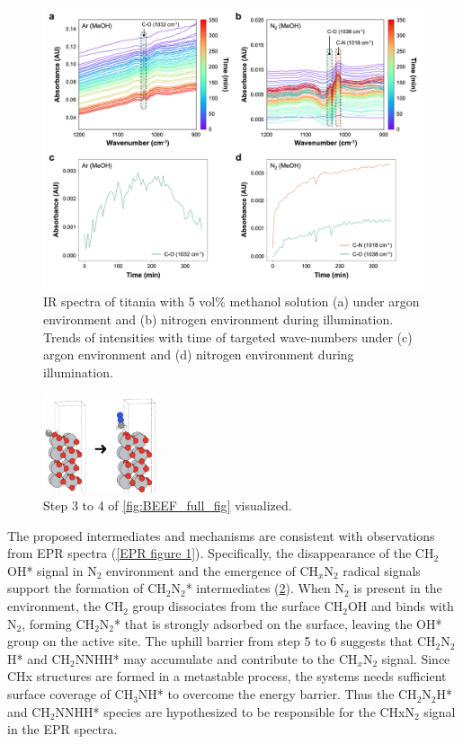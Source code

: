 \begin{figure}
    \centering
    \includegraphics[width=\linewidth]{figures/proposal_figures/Fig2_6_11_23.jpg}
    \caption{IR spectra of titania with 5 vol\% methanol solution (a) under argon environment and (b) nitrogen environment during illumination. Trends of intensities with time of targeted wave-numbers under (c) argon environment and (d) nitrogen environment during illumination.}
    \label{EPR figure 2}
\end{figure}

\begin{figure}[h]
\centering
\includegraphics[width=0.3\textwidth]{figures/proposal_figures/step_3.png}
\caption{Step 3 to 4 of \ref{fig:BEEF_full_fig} visualized.}
\label{fig:step_3}
\end{figure}
The proposed intermediates and mechanisms are consistent with observations from EPR spectra (\ref{EPR figure 1}). Specifically, the disappearance of the CH$_2$OH* signal in N$_2$ environment and the emergence of CH$_x$N$_2$ radical signals support the formation of CH$_2$N$_2$* intermediates (\ref{fig:step_3}). When N$_2$ is present in the environment, the CH$_2$ group dissociates from the surface CH$_2$OH and binds with N$_2$, forming CH$_2$N$_2$* that is strongly adsorbed on the surface, leaving the OH* group on the active site. The uphill barrier from step 5 to 6 suggests that CH$_2$N$_2$H* and CH$_2$NNHH* may accumulate and contribute to the CH$_x$N$_2$ signal. Since CHx structures are formed in a metastable process, the systems needs sufficient surface coverage of CH$_3$NH* to overcome the energy barrier. Thus the CH$_2$N$_2$H* and CH$_2$NNHH* species are hypothesized to be responsible for the CHxN$_2$ signal in the EPR spectra.

